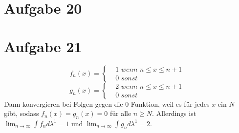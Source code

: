 \documentclass[10pt,a4paper]{article}
\begin{document}
\section{Aufgabe 20}

\section{Aufgabe 21}
\begin{equation}
  f_{n}(x) = 
  \begin{cases}
    & 1\textit{ wenn $n \le x \le n + 1$}\\
    & 0\textit{ sonst}
  \end{cases}
\end{equation}
\begin{equation}
  g_{n}(x) = 
  \begin{cases}
    & 2\textit{ wenn $n \le x \le n + 1$}\\
    & 0\textit{ sonst}
  \end{cases}
\end{equation}
Dann konvergieren bei Folgen gegen die $0$-Funktion, weil es für jedes $x$ ein $N$ gibt, sodass $f_{n}(x) = g_{n}(x) = 0$ für alle $n \ge N$.
Allerdings ist $\lim_{n \rightarrow \infty} \int f_{n} d \lambda^{1} = 1$ und $\lim_{n \rightarrow \infty} \int g_{n} d \lambda^{1} = 2$.
\end{document}
